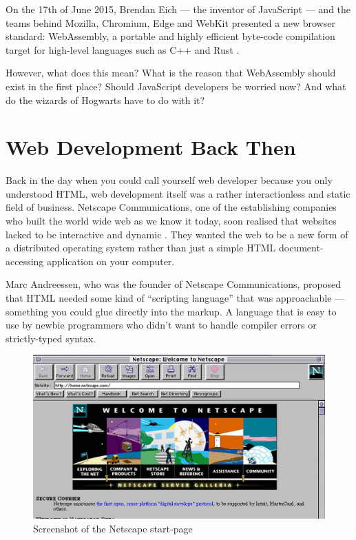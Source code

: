 \documentclass[10pt]{article}
\begin{document}
\begin{sloppypar}
  On the 17th of June 2015, Brendan Eich — the inventor of JavaScript — and the teams behind Mozilla, Chromium, Edge and WebKit presented a new browser standard: WebAssembly, a portable and highly efficient byte-code compilation target for high-level languages such as C++ and Rust \citep{eich_asmjs_2015}.

  However, what does this mean? What is the reason that WebAssembly should exist in the first place? Should JavaScript developers be worried now? And what do the wizards of Hogwarts have to do with it?

  \section{Web Development Back Then}
  \label{sec:back-then}

  Back in the day when you could call yourself web developer because you only understood HTML, web development itself was a rather interactionless and static field of business. Netscape Communications, one of the establishing companies who built the world wide web as we know it today, soon realised that websites lacked to be interactive and dynamic \citep{cassel_brendan_2018}. They wanted the web to be a new form of a distributed operating system rather than just a simple HTML document-accessing application on your computer.

  Marc Andreessen, who was the founder of Netscape Communications, proposed that HTML needed some kind of “scripting language” that was approachable — something you could glue directly into the markup. A language that is easy to use by newbie programmers who didn’t want to handle compiler errors or strictly-typed syntax.

  \begin{figure}[ht]
    \centering
    \includegraphics[width=\textwidth]{figures/002.jpg}
    \caption{Screenshot of the Netscape start-page \citep{npr_home_nodate}}
    \label{fig:netscape}
  \end{figure}


\end{sloppypar}
\end{document}
